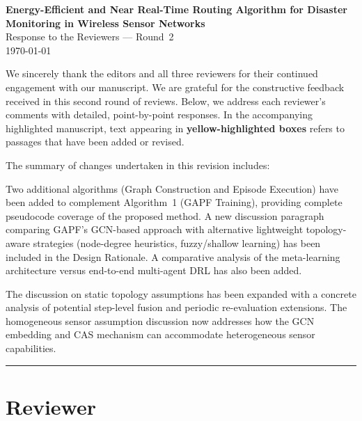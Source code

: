 \documentclass[11pt]{article}
\newcounter{reviewer}
\newcounter{point}[reviewer]
\newcommand{\reviewersection}{\stepcounter{reviewer} \bigskip \hrule
                  \section*{Reviewer \thereviewer}}
\begin{document}
\begin{center}
\Large
\textbf{Energy-Efficient and Near Real-Time Routing Algorithm for Disaster Monitoring in Wireless Sensor Networks}\\
\vspace{0.5cm}
\large
\vspace{0.25cm}
Response to the Reviewers — Round~2\\
\today
\end{center}
\vspace{1.5cm}

We sincerely thank the editors and all three reviewers for their continued engagement with our manuscript. We are grateful for the constructive feedback received in this second round of reviews. Below, we address each reviewer's comments with detailed, point-by-point responses. In the accompanying highlighted manuscript, text appearing in \textbf{\colorbox{yellow!15}{yellow-highlighted boxes}} refers to passages that have been added or revised.

\bigskip

The summary of changes undertaken in this revision includes:
\begin{description}[leftmargin=!, labelwidth=\widthof{\textbf{Proposed Method (Sec.~III)}}]
  \item[\textbf{Proposed Method (Sec.~III)}] Two additional algorithms (Graph Construction and Episode Execution) have been added to complement Algorithm~1 (GAPF Training), providing complete pseudocode coverage of the proposed method. A new discussion paragraph comparing GAPF's GCN-based approach with alternative lightweight topology-aware strategies (node-degree heuristics, fuzzy/shallow learning) has been included in the Design Rationale. A comparative analysis of the meta-learning architecture versus end-to-end multi-agent DRL has also been added.
  
  \item[\textbf{Limitations (Sec.~IV)}] The discussion on static topology assumptions has been expanded with a concrete analysis of potential step-level fusion and periodic re-evaluation extensions. The homogeneous sensor assumption discussion now addresses how the GCN embedding and CAS mechanism can accommodate heterogeneous sensor capabilities.
\end{description}

\reviewersection
\end{document}
